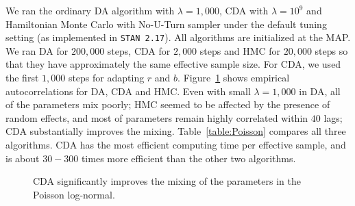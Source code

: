 \documentclass[twoside,11pt]{article}
\newcommand{\1}{\mathbf 1}
\begin{document}
{We ran the ordinary DA algorithm with $\lambda=1,000$, CDA with $\lambda=10^9$ and Hamiltonian Monte Carlo with No-U-Turn sampler under the default tuning setting (as implemented in \texttt{STAN 2.17}). All algorithms are initialized at the MAP. We ran DA for $200,000$ steps, CDA for $2,000$ steps and HMC for $20,000$ steps so that they have approximately the same effective sample size. For CDA, we used the first $1,000$ steps for adapting $r$ and $b$. Figure~\ref{data_poisson} shows empirical autocorrelations for DA, CDA and HMC. Even with small $\lambda = 1,000$ in DA, all of the parameters mix poorly; HMC seemed to be affected by the presence of random effects, and most of parameters remain highly correlated within $40$ lags; CDA substantially improves the mixing. Table~\ref{table:Poisson} compares all three algorithms. CDA has the most efficient computing time per effective sample, and is about $30-300$ times more efficient than the other two algorithms.
\begin{figure}[H]
  {%
    \quad
      \centering
  }
    {\caption{CDA significantly improves the mixing of the parameters in the Poisson log-normal. \label{data_poisson}}}
\end{figure}
 
}
\end{document}

